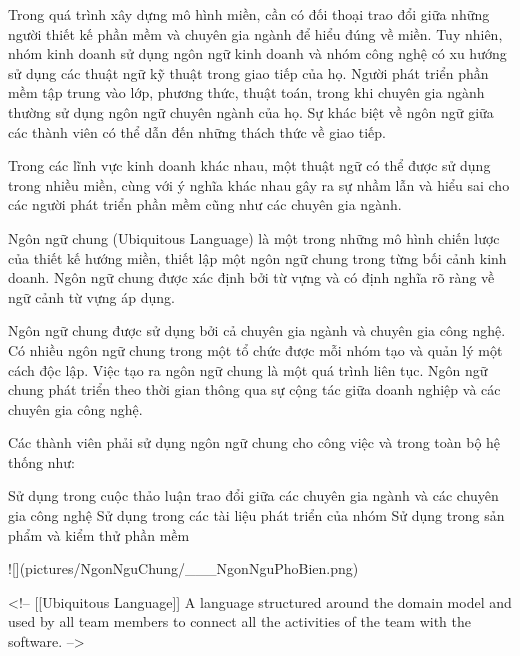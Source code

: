 
Trong quá trình xây dựng mô hình miền, cần có đối thoại trao đổi giữa những người thiết kế phần mềm và chuyên gia ngành để hiểu đúng về miền. Tuy nhiên, nhóm kinh doanh sử dụng ngôn ngữ kinh doanh và nhóm công nghệ có xu hướng sử dụng các thuật ngữ kỹ thuật trong giao tiếp của họ. Người phát triển phần mềm tập trung vào lớp, phương thức, thuật toán, trong khi chuyên gia ngành thường sử dụng ngôn ngữ chuyên ngành của họ. Sự khác biệt về ngôn ngữ giữa các thành viên có thể dẫn đến những thách thức về giao tiếp.

Trong các lĩnh vực kinh doanh khác nhau, một thuật ngữ có thể được sử dụng trong nhiều miền, cùng với ý nghĩa khác nhau gây ra sự nhầm lẫn và hiểu sai cho các người phát triển phần mềm cũng như các chuyên gia ngành.


Ngôn ngữ chung (Ubiquitous Language) là một trong những mô hình chiến lược của thiết kế hướng miền, thiết lập một ngôn ngữ chung trong từng bối cảnh kinh doanh.
Ngôn ngữ chung được xác định bởi từ vựng và có định nghĩa rõ ràng về ngữ cảnh từ vựng áp dụng.


Ngôn ngữ chung được sử dụng bởi cả chuyên gia ngành và chuyên gia công nghệ.
Có nhiều ngôn ngữ chung trong một tổ chức được mỗi nhóm tạo và quản lý một cách độc lập.
Việc tạo ra ngôn ngữ chung là một quá trình liên tục. Ngôn ngữ chung phát triển theo thời gian thông qua sự cộng tác giữa doanh nghiệp và các chuyên gia công nghệ.

Các thành viên phải sử dụng ngôn ngữ chung cho công việc và trong toàn bộ hệ thống như:

Sử dụng trong cuộc thảo luận trao đổi giữa các chuyên gia ngành và các chuyên gia công nghệ
Sử dụng trong các tài liệu phát triển của nhóm
Sử dụng trong sản phẩm và kiểm thử phần mềm

![](pictures/NgonNguChung/___NgonNguPhoBien.png)



<!-- [[Ubiquitous Language]] A language structured around the domain model and used by all team members to connect all the activities of the team with the software. -->

